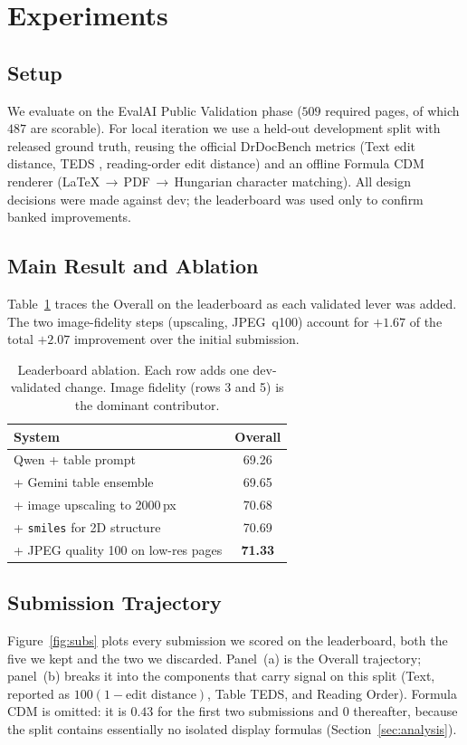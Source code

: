 \documentclass[11pt]{article}
\newcommand{\best}[1]{\textbf{#1}}
\begin{document}
\section{Experiments}

\subsection{Setup}
We evaluate on the EvalAI Public Validation phase ($509$ required pages, of which
$487$ are scorable). For local iteration we use a held-out development split with
released ground truth, reusing the official DrDocBench metrics (Text edit distance,
TEDS \citep{zhong2020image}, reading-order edit distance) and an offline Formula CDM
\citep{wang2024cdm} renderer
(\LaTeX\,$\rightarrow$\,PDF\,$\rightarrow$\,Hungarian character matching). All
design decisions were made against dev; the leaderboard was used only to confirm
banked improvements.

\subsection{Main Result and Ablation}
Table~\ref{tab:ablation} traces the Overall on the leaderboard as each validated
lever was added. The two image-fidelity steps (upscaling, JPEG~q100) account for
$+1.67$ of the total $+2.07$ improvement over the initial submission.

\begin{table}[t]
\centering
\small
\begin{tabular}{lc}
\toprule
System & Overall \\
\midrule
Qwen + table prompt & 69.26 \\
\;+ Gemini table ensemble & 69.65 \\
\;+ image upscaling to 2000\,px & 70.68 \\
\;+ \texttt{smiles} for 2D structure & 70.69 \\
\;+ JPEG quality 100 on low-res pages & \best{71.33} \\
\bottomrule
\end{tabular}
\caption{Leaderboard ablation. Each row adds one dev-validated change. Image fidelity
(rows 3 and 5) is the dominant contributor.}
\label{tab:ablation}
\end{table}

\subsection{Submission Trajectory}
\label{sec:trajectory}
Figure~\ref{fig:subs} plots every submission we scored on the leaderboard, both the
five we kept and the two we discarded. Panel~(a) is the Overall trajectory; panel~(b)
breaks it into the components that carry signal on this split (Text, reported as
$100(1-\text{edit distance})$, Table TEDS, and Reading Order). Formula CDM is omitted:
it is $0.43$ for the first two submissions and $0$ thereafter, because the split
contains essentially no isolated display formulas (Section~\ref{sec:analysis}).
\end{document}
